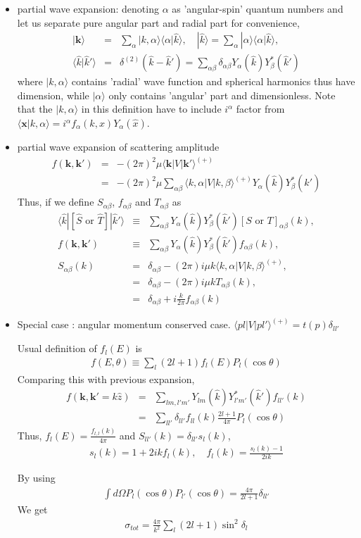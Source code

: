 \documentclass[10pt]{book}
\def\bm{\boldsymbol}
\newcommand{\bea}{\begin{eqnarray}}
\newcommand{\eea}{\end{eqnarray}}
\newcommand{\no}{\nonumber \\}
\def\vk{{\bm k}}
\def\vx{{\bm x}}
\def\la{\langle}
\def\ra{\rangle}
\begin{document}
\begin{itemize}
\item partial wave expansion: denoting $\alpha$ as
'angular-spin' quantum numbers and let us separate pure angular part
and radial part for convenience,
\bea
|\vk\ra&=&\sum_\alpha |k, \alpha\ra  
                \la \alpha|\hat{k}\ra
,\quad 
|\hat{k}\ra = \sum_{\alpha}|\alpha\ra \la \alpha|\hat{k}\ra,\no
\la \hat{k}|\hat{k}'\ra&=&\delta^{(2)}(\hat{k}-\hat{k}')
 =\sum_{\alpha\beta}\delta_{\alpha\beta} 
  Y_{\alpha}(\hat{k})Y_{\beta}^*(\hat{k}')
\eea
where $|k,\alpha\ra$ contains 'radial' wave function
and spherical harmonics 
thus have dimension,
while $|\alpha\ra$ only contains 'angular' part
and dimensionless.
Note that the $|k,\alpha\ra$ in this definition 
have to include $i^\alpha$ factor from
$\la \vx|k,\alpha\ra= i^\alpha f_\alpha(k,x) Y_\alpha(\hat{x})$.


\item partial wave expansion of scattering amplitude
\bea
f(\vk,\vk')&=&-(2\pi)^2\mu \la \vk|V|\vk'\ra^{(+)}\no
           &=&-(2\pi)^2\mu \sum_{\alpha\beta} 
        \la k,\alpha| V| k,\beta\ra^{(+)}
        Y_{\alpha}(\hat{k})Y_{\beta}^*(\hat{k}')   
\eea
Thus, if we define $S_{\alpha\beta}$, $f_{\alpha\beta}$ and
$T_{\alpha\beta}$ as
\bea
\la \hat{k}|
[\hat{S}\mbox{ or }\hat{T}]   |\hat{k}'\ra&\equiv&\sum_{\alpha\beta}
      Y_{\alpha}(\hat{k})Y_{\beta}^*(\hat{k}') 
      [S\mbox{ or } T]_{\alpha\beta}(k),\no
f(\vk,\vk')&\equiv&\sum_{\alpha\beta}
      Y_{\alpha}(\hat{k})Y_{\beta}^*(\hat{k}') f_{\alpha\beta}(k),\no
S_{\alpha\beta}(k)
&=&\delta_{\alpha\beta}-(2\pi)i \mu k 
        \la k,\alpha| V| k,\beta\ra^{(+)},\no
&=&\delta_{\alpha\beta} -(2\pi)i \mu k T_{\alpha\beta}(k),\no
&=&\delta_{\alpha\beta}+ i\frac{k}{2\pi} f_{\alpha\beta}(k)             
\eea

\item Special case : angular momentum conserved case.
 $\la pl|V|pl'\ra^{(+)}=t(p)\delta_{ll'}$

Usual definition of $f_l(E)$ is
\bea
f(E,\theta)\equiv\sum_{l}(2l+1)f_l(E)P_l(\cos\theta)
\eea
Comparing this with previous expansion,
\bea
f(\vk,\vk'=k \hat{z}) &=&\sum_{lm, l' m'} 
         Y_{lm}(\hat{k})Y^*_{l'm'}(\hat{k}')
         f_{l l'}(k)\no
    &=&\sum_{ll'} \delta_{ll'} f_{ll}(k)
           \frac{2l+1}{4\pi}P_l(\cos\theta)
\eea
Thus, $f_l(E)=\frac{f_{l,l}(k)}{4\pi}$ and $S_{ll'}(k)=\delta_{ll'}s_l(k)$,
\bea
s_l(k)=1+2ik f_l(k), \quad f_l(k)=\frac{s_l(k)-1}{2ik}
\eea

By using 
\bea
\int d\Omega P_l(\cos\theta)P_{l'}(\cos\theta)=\frac{4\pi}{2l+1}\delta_{ll'}
\eea
We get
\bea
\sigma_{tot}=\frac{4\pi}{k^2}\sum_l (2l+1)\sin^2\delta_l
\eea
\end{itemize}
\end{document}
